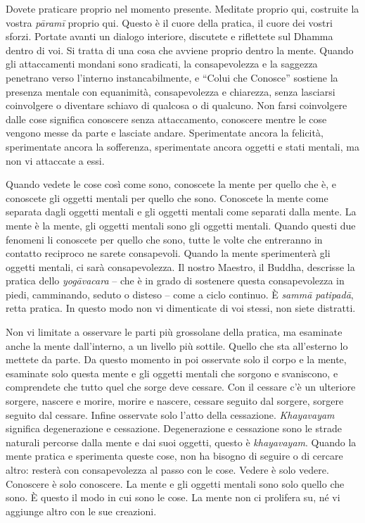 Dovete praticare proprio nel momento presente. Meditate proprio qui,
costruite la vostra \emph{pāramī} proprio qui. Questo è il cuore della
pratica, il cuore dei vostri sforzi. Portate avanti un dialogo
interiore, discutete e riflettete sul Dhamma dentro di voi. Si tratta di
una cosa che avviene proprio dentro la mente. Quando gli attaccamenti
mondani sono sradicati, la consapevolezza e la saggezza penetrano verso
l'interno instancabilmente, e ``Colui che Conosce'' sostiene la presenza
mentale con equanimità, consapevolezza e chiarezza, senza lasciarsi
coinvolgere o diventare schiavo di qualcosa o di qualcuno. Non farsi
coinvolgere dalle cose significa conoscere senza attaccamento, conoscere
mentre le cose vengono messe da parte e lasciate andare. Sperimentate
ancora la felicità, sperimentate ancora la sofferenza, sperimentate
ancora oggetti e stati mentali, ma non vi attaccate a essi.

Quando vedete le cose così come sono, conoscete la mente per quello che
è, e conoscete gli oggetti mentali per quello che sono. Conoscete la
mente come separata dagli oggetti mentali e gli oggetti mentali come
separati dalla mente. La mente è la mente, gli oggetti mentali sono gli
oggetti mentali. Quando questi due fenomeni li conoscete per quello che
sono, tutte le volte che entreranno in contatto reciproco ne sarete
consapevoli. Quando la mente sperimenterà gli oggetti mentali, ci sarà
consapevolezza. Il nostro Maestro, il Buddha, descrisse la pratica dello
\emph{yogāvacara} -- che è in grado di sostenere questa consapevolezza
in piedi, camminando, seduto o disteso -- come a ciclo continuo. È
\emph{sammā patipadā}, retta pratica. In questo modo non vi dimenticate
di voi stessi, non siete distratti.

Non vi limitate a osservare le parti più grossolane della pratica, ma
esaminate anche la mente dall'interno, a un livello più sottile. Quello
che sta all'esterno lo mettete da parte. Da questo momento in poi
osservate solo il corpo e la mente, esaminate solo questa mente e gli
oggetti mentali che sorgono e svaniscono, e comprendete che tutto quel
che sorge deve cessare. Con il cessare c'è un ulteriore sorgere, nascere
e morire, morire e nascere, cessare seguito dal sorgere, sorgere seguito
dal cessare. Infine osservate solo l'atto della cessazione.
\emph{Khayavayam} significa degenerazione e cessazione. Degenerazione e
cessazione sono le strade naturali percorse dalla mente e dai suoi
oggetti, questo è \emph{khayavayam}. Quando la mente pratica e
sperimenta queste cose, non ha bisogno di seguire o di cercare altro:
resterà con consapevolezza al passo con le cose. Vedere è solo vedere.
Conoscere è solo conoscere. La mente e gli oggetti mentali sono solo
quello che sono. È questo il modo in cui sono le cose. La mente non ci
prolifera su, né vi aggiunge altro con le sue creazioni.

